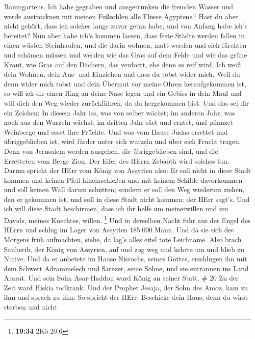 Baumgartens.  Ich habe gegraben und ausgetrunken die
fremden Wasser und werde austrocknen mit meinen Fußsohlen alle Flüsse
Ägyptens.``  Hast du aber nicht gehört, dass ich solches
lange zuvor getan habe, und von Anfang habe ich's bereitet? Nun aber
habe ich's kommen lassen, dass feste Städte werden fallen in einen
wüsten Steinhaufen,  und die darin wohnen, matt werden und
sich fürchten und schämen müssen und werden wie das Gras auf dem Felde
und wie das grüne Kraut, wie Gras auf den Dächern, das verdorrt, ehe
denn es reif wird.  Ich weiß dein Wohnen, dein Aus- und
Einziehen und dass du tobst wider mich.  Weil du denn wider
mich tobst und dein Übermut vor meine Ohren heraufgekommen ist, so will
ich dir einen Ring an deine Nase legen und ein Gebiss in dein Maul und
will dich den Weg wieder zurückführen, da du hergekommen bist.
 Und das sei dir ein Zeichen: In diesem Jahr iss, was von
selber wächst; im anderen Jahr, was noch aus den Wurzeln wächst: im
dritten Jahr säet und erntet, und pflanzet Weinberge und esset ihre
Früchte.  Und was vom Hause Judas errettet und
übriggeblieben ist, wird fürder unter sich wurzeln und über sich Frucht
tragen.  Denn von Jerusalem werden ausgehen, die
übriggeblieben sind, und die Erretteten vom Berge Zion. Der Eifer des
HErrn Zebaoth wird solches tun.  Darum spricht der HErr vom
König von Assyrien also: Er soll nicht in diese Stadt kommen und keinen
Pfeil hineinschießen und mit keinem Schilde davorkommen und soll keinen
Wall darum schütten;  sondern er soll den Weg wiederum
ziehen, den er gekommen ist, und soll in diese Stadt nicht kommen; der
HErr sagt's.  Und ich will diese Stadt beschirmen, dass ich
ihr helfe um meinetwillen und um Davids, meines Knechtes, willen.
\footnote{\textbf{19:34} 2Kö 20,6}  Und in derselben Nacht
fuhr aus der Engel des HErrn und schlug im Lager von Assyrien 185.000
Mann. Und da sie sich des Morgens früh aufmachten, siehe, da lag's alles
eitel tote Leichname.  Also brach Sanherib, der König von
Assyrien, auf und zog weg und kehrte um und blieb zu Ninive.
 Und da er anbetete im Hause Nisrochs, seines Gottes,
erschlugen ihn mit dem Schwert Adrammelech und Sarezer, seine Söhne, und
sie entrannen ins Land Ararat. Und sein Sohn Asar-Haddon ward König an
seiner Statt. \# 20  Zu der Zeit ward Hiskia todkrank. Und
der Prophet Jesaja, der Sohn des Amoz, kam zu ihm und sprach zu ihm: So
spricht der HErr: Beschicke dein Haus; denn du wirst sterben und nicht
